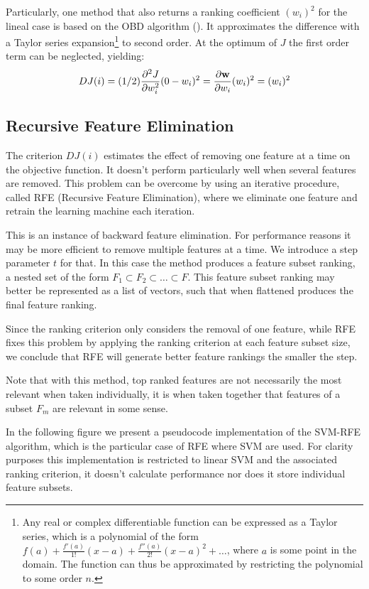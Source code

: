 Particularly, one method that also returns a ranking coefficient $(w_i)^2$ for the lineal case is based on the OBD algorithm (\cite{guyon_gene_2002}). It approximates the dif\-fer\-ence with a Taylor series expansion\footnote{Any real or complex differentiable function can be expressed as a Taylor series, which is a polynomial of the form $f(a) + \frac{f'(a)}{1!}(x - a) + \frac{f''(a)}{2!}(x - a)^2 + \dots$, where $a$ is some point in the domain. The function can thus be approximated by restricting the polynomial to some order $n$.} to second order. At the optimum of $J$ the first order term can be neglected, yielding:
\begin{align*}
    DJ(i) = (1/2) \frac{\partial^2 J}{\partial w_i^2} (0 - w_i)^2 = \frac{\partial \mathbf{w}}{\partial w_i} (w_i)^2 = (w_i)^2
\end{align*}

\subsection{Recursive Feature Elimination}

The criterion $DJ(i)$ estimates the effect of removing one feature at a time on the objective function. It doesn't perform particularly well when several features are removed. This problem can be overcome by using an iterative procedure, called RFE (Recursive Feature Elimination), where we eliminate one feature and retrain the learning machine each iteration.

This is an instance of backward feature elimination. For performance reasons it may be more efficient to remove multiple features at a time. We introduce a step parameter $t$ for that. In this case the method produces a feature subset ranking, a nested set of the form $F_1 \subset F_2 \subset \dots \subset F$. This feature subset ranking may better be represented as a list of vectors, such that when flat\-tened produces the final feature ranking.

Since the ranking criterion only considers the removal of one feature, while RFE fixes this problem by applying the ranking criterion at each feature subset size, we conclude that RFE will generate better feature rankings the smaller the step.

Note that with this method, top ranked features are not necessarily the most relevant when taken individually, it is when taken together that features of a subset $F_m$ are relevant in some sense.

In the following figure we present a pseudocode implementation of the SVM-RFE algorithm, which is the particular case of RFE where SVM are used. For clarity purposes this implementation is restricted to linear SVM and the associated ranking criterion, it doesn't calculate performance nor does it store individual feature subsets.


